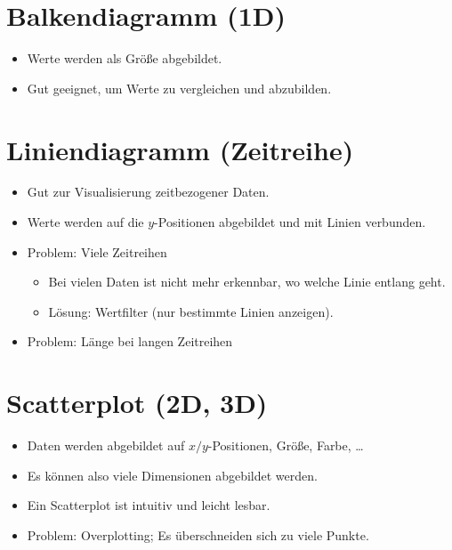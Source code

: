 	\section{Balkendiagramm (1D)}
		\begin{itemize}
			\item Werte werden als Größe abgebildet.
			\item Gut geeignet, um Werte zu vergleichen und abzubilden.
		\end{itemize}

	\section{Liniendiagramm (Zeitreihe)}
		\begin{itemize}
			\item Gut zur Visualisierung zeitbezogener Daten.
			\item Werte werden auf die \(y\)-Positionen abgebildet und mit Linien verbunden.
			\item Problem: Viele Zeitreihen
				\begin{itemize}
					\item Bei vielen Daten ist nicht mehr erkennbar, wo welche Linie entlang geht.
					\item Lösung: Wertfilter (nur bestimmte Linien anzeigen).
				\end{itemize}
			\item Problem: Länge bei langen Zeitreihen
		\end{itemize}

	\section{Scatterplot (2D, 3D)}
		\begin{itemize}
			\item Daten werden abgebildet auf \(x/y\)-Positionen, Größe, Farbe, \dots
			\item Es können also viele Dimensionen abgebildet werden.
			\item Ein Scatterplot ist intuitiv und leicht lesbar.
			\item Problem: Overplotting; Es überschneiden sich zu viele Punkte.
		\end{itemize}


